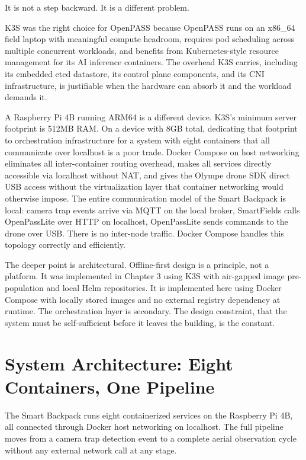 It is not a step backward. It is a different problem.

K3S was the right choice for OpenPASS because OpenPASS runs on an x86\_64 field laptop with meaningful compute headroom, requires pod scheduling across multiple concurrent workloads, and benefits from Kubernetes-style resource management for its AI inference containers. The overhead K3S carries, including its embedded etcd datastore, its control plane components, and its CNI infrastructure, is justifiable when the hardware can absorb it and the workload demands it.

A Raspberry Pi 4B running ARM64 is a different device. K3S's minimum server footprint is 512MB RAM. On a device with 8GB total, dedicating that footprint to orchestration infrastructure for a system with eight containers that all communicate over localhost is a poor trade. Docker Compose on host networking eliminates all inter-container routing overhead, makes all services directly accessible via localhost without NAT, and gives the Olympe drone SDK direct USB access without the virtualization layer that container networking would otherwise impose. The entire communication model of the Smart Backpack is local: camera trap events arrive via MQTT on the local broker, SmartFields calls OpenPassLite over HTTP on localhost, OpenPassLite sends commands to the drone over USB. There is no inter-node traffic. Docker Compose handles this topology correctly and efficiently.

The deeper point is architectural. Offline-first design is a principle, not a platform. It was implemented in Chapter 3 using K3S with air-gapped image pre-population and local Helm repositories. It is implemented here using Docker Compose with locally stored images and no external registry dependency at runtime. The orchestration layer is secondary. The design constraint, that the system must be self-sufficient before it leaves the building, is the constant.

\section{System Architecture: Eight Containers, One Pipeline}
\label{sec:ch4_openpasslite}
The Smart Backpack runs eight containerized services on the Raspberry Pi 4B, all connected through Docker host networking on localhost. The full pipeline moves from a camera trap detection event to a complete aerial observation cycle without any external network call at any stage.

